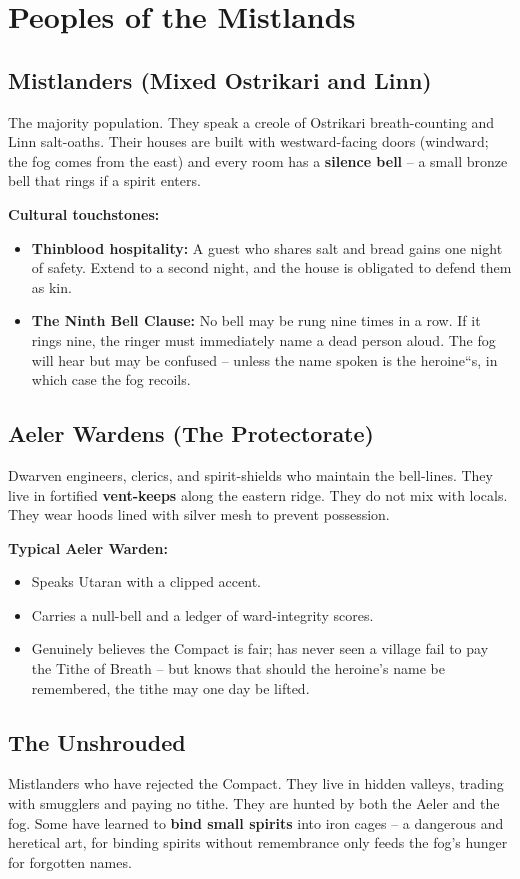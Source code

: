 \documentclass[12pt]{article}
\begin{document}
\section{Peoples of the Mistlands}

\subsection{Mistlanders (Mixed Ostrikari and Linn)}
The majority population. They speak a creole of Ostrikari breath-counting and Linn salt-oaths. Their houses are built with westward-facing doors (windward; the fog comes from the east) and every room has a \textbf{silence bell} -- a small bronze bell that rings if a spirit enters.

\textbf{Cultural touchstones:}
\begin{itemize}[leftmargin=*]
  \item \textbf{Thinblood hospitality:} A guest who shares salt and bread gains one night of safety. Extend to a second night, and the house is obligated to defend them as kin.
  \item \textbf{The Ninth Bell Clause:} No bell may be rung nine times in a row. If it rings nine, the ringer must immediately name a dead person aloud. The fog will hear but may be confused -- unless the name spoken is the heroine``s, in which case the fog recoils.
\end{itemize}

\subsection{Aeler Wardens (The Protectorate)}
Dwarven engineers, clerics, and spirit-shields who maintain the bell-lines. They live in fortified \textbf{vent-keeps} along the eastern ridge. They do not mix with locals. They wear hoods lined with silver mesh to prevent possession.

\textbf{Typical Aeler Warden:}
\begin{itemize}[leftmargin=*]
  \item Speaks Utaran with a clipped accent.
  \item Carries a null-bell and a ledger of ward-integrity scores.
  \item Genuinely believes the Compact is fair; has never seen a village fail to pay the Tithe of Breath -- but knows that should the heroine's name be remembered, the tithe may one day be lifted.
\end{itemize}

\subsection{The Unshrouded}
Mistlanders who have rejected the Compact. They live in hidden valleys, trading with smugglers and paying no tithe. They are hunted by both the Aeler and the fog. Some have learned to \textbf{bind small spirits} into iron cages -- a dangerous and heretical art, for binding spirits without remembrance only feeds the fog's hunger for forgotten names.
\end{document}
